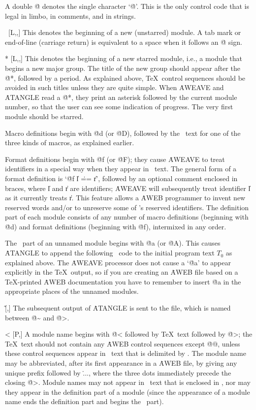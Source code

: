 \@@ [C,L,M,P,S,T] A double \.@ denotes the single character `\.@'. This is
the only control code that is legal in limbo, in comments, and in strings.
 
\@\ [\overline L,\oP,\oT] This denotes the beginning of a new
(unstarred) module. A tab mark or end-of-line (carriage return)
is equivalent to a space when it follows an \.@ sign.
 
\@* [\overline L,\oP,\oT] This denotes the beginning of a new starred
module, i.e., a module that begins a new major group. The title of the new
group should appear after the \.{@*}, followed by a period. As explained
above, \TeX\ control sequences should be avoided in such titles unless
they are quite simple. When \.{AWEAVE} and \.{ATANGLE} read a \.{@*}, they
print an asterisk followed by the current module number, so that the user
can see some indication of progress. The very first module should be starred.
 
\@d [\oP,\oT] Macro definitions begin with \.{@d} (or \.{@D}), followed by
the \ADA\ text for one of the three kinds of macros, as explained
earlier.
 
\@f [\oP,\oT] Format definitions begin with \.{@f} (or \.{@F}); they cause
\.{AWEAVE} to treat identifiers in a special way when they appear in
\ADA\ text. The general form of a format definition is `\.{@f} \|l \.{==}
\|r', followed by an optional comment enclosed in braces, where \|l and \|r
are identifiers; \.{AWEAVE} will subsequently treat identifier \|l as it
currently treats \|r. This feature allows a \.{AWEB} programmer to invent
new reserved words and/or to unreserve some of \ADA's reserved
identifiers. The definition part of each module consists of any number of
macro definitions (beginning with \.{@d}) and format definitions (beginning
with \.{@f}), intermixed in any order.
 
\@a [\oP,\oT] The \ADA\ part of an unnamed module begins with \.{@a}
(or \.{@A}). This causes \.{ATANGLE} to append the following \ADA\ code
to the initial program text $T_0$ as explained above. The \.{AWEAVE}
processor does not cause a `\.{@a}' to appear explicitly in the \TeX\
output, so if you are creating an \.{AWEB} file based on a \TeX-printed
\.{AWEB} documentation you have to remember to insert \.{@a} in the
appropriate places of the unnamed modules.
 
\@\~ [\oP,\oT] The subsequent output of \.{ATANGLE} is sent to the file,
which is named between \.{@\~} and \.{@>}.

\@< [P,\oT] A module name begins with \.{@<} followed by \TeX\ text followed
by \.{@>}; the \TeX\ text should not contain any \.{AWEB} control sequences
except \.{@@}, unless these control sequences appear in \ADA\ text that
is delimited by \ab. The module name may be abbreviated, after its first
appearance in a \.{AWEB} file, by giving any unique prefix followed by \.{...},
where the three dots immediately precede the closing \.{@>}. Module names may
not appear in \ADA\ text that is enclosed in \ab, nor may they appear
in the definition part of a module (since the appearance of a module name
ends the definition part and begins the \ADA\ part).
 
